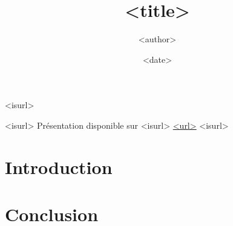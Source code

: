 \documentclass{beamer}
\title{<title>}
\author{<author>}
\institute{<institute>}
\date{<date>}
\begin{document}

\begin{frame}
  \titlepage

  <isurl>\begin{center}
  <isurl>  \footnotesize{Présentation disponible sur
  <isurl>  \url{<url>}}
  <isurl>\end{center}
\end{frame}


\section*{Introduction} %

\section*{Conclusion} %
\end{document}
